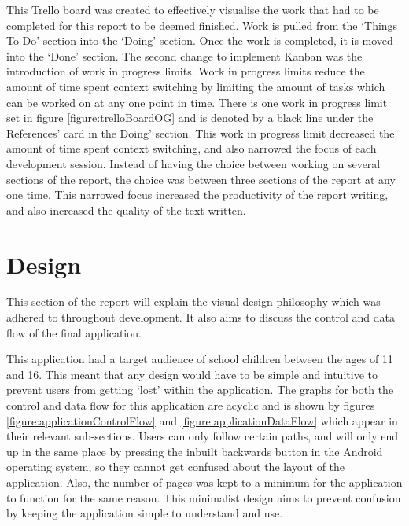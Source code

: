 \documentclass{article}
\begin{document}
This Trello board was created to effectively visualise the work that had to be completed for this report to be deemed finished. Work is pulled from the `Things To Do' section into the `Doing' section. Once the work is completed, it is moved into the `Done' section. The second change to implement Kanban was the introduction of work in progress limits. Work in progress limits reduce the amount of time spent context switching by limiting the amount of tasks which can be worked on at any one point in time. There is one work in progress limit set in figure \ref{figure:trelloBoardOG} and is denoted by a black line under the 	References' card in the 	Doing' section. This work in progress limit decreased the amount of time spent context switching, and also narrowed the focus of each development session. Instead of having the choice between working on several sections of the report, the choice was between three sections of the report at any one time. This narrowed focus increased the productivity of the report writing, and also increased the quality of the text written. 

%
%
%

\section{Design}
\label{section:design}

This section of the report will explain the visual design philosophy which was adhered to throughout development. It also aims to discuss the control and data flow of the final application. \par

This application had a target audience of school children between the ages of 11 and 16. This meant that any design would have to be simple and intuitive to prevent users from getting `lost' within the application. The graphs for both the control and data flow for this application are acyclic and is shown by figures \ref{figure:applicationControlFlow} and \ref{figure:applicationDataFlow} which appear in their relevant sub-sections. Users can only follow certain paths, and will only end up in the same place by pressing the inbuilt backwards button in the Android operating system, so they cannot get confused about the layout of the application. Also, the number of pages was kept to a minimum for the application to function for the same reason. This minimalist design aims to prevent confusion by keeping the application simple to understand and use. \par
\end{document}
